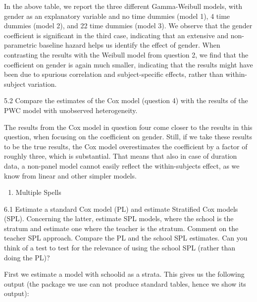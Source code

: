 \documentclass[
]{article}
\providecommand{\tightlist}{%
  \setlength{\itemsep}{0pt}\setlength{\parskip}{0pt}}
\begin{document}
In the above table, we report the three different Gamma-Weibull models,
with gender as an explanatory variable and no time dummies (model 1), 4
time dummies (model 2), and 22 time dummies (model 3). We observe that
the gender coefficient is significant in the third case, indicating that
an extensive and non-parametric baseline hazard helps us identify the
effect of gender. When contrasting the results with the Weibull model
from question 2, we find that the coefficient on gender is again much
smaller, indicating that the results might have been due to spurious
correlation and subject-specific effects, rather than within-subject
variation.

5.2 Compare the estimates of the Cox model (question 4) with the results
of the PWC model with unobserved heterogeneity.

The results from the Cox model in question four come closer to the
results in this question, when focusing on the coefficient on gender.
Still, if we take these results to be the true results, the Cox model
overestimates the coefficient by a factor of roughly three, which is
substantial. That means that also in case of duration data, a non-panel
model cannot easily reflect the within-subjects effect, as we know from
linear and other simpler models.

\clearpage

\begin{enumerate}
\def\labelenumi{\arabic{enumi}.}
\setcounter{enumi}{5}
\tightlist
\item
  Multiple Spells
\end{enumerate}

6.1 Estimate a standard Cox model (PL) and estimate Stratified Cox
models (SPL). Concerning the latter, estimate SPL models, where the
school is the stratum and estimate one where the teacher is the stratum.
Comment on the teacher SPL approach. Compare the PL and the school SPL
estimates. Can you think of a test to test for the relevance of using
the school SPL (rather than doing the PL)?

First we estimate a model with schoolid as a strata. This gives us the
following output (the package we use can not produce standard tables,
hence we show its output):
\end{document}
